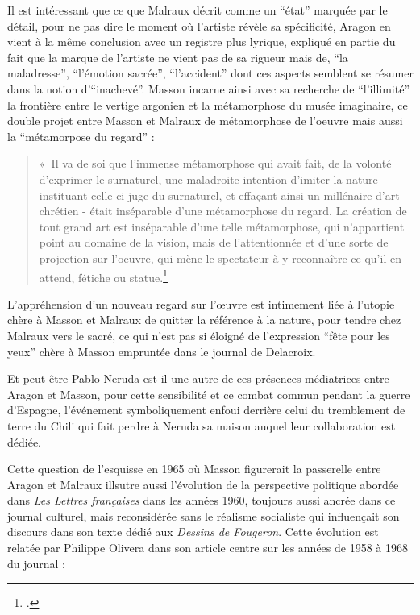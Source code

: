 Il est intéressant que ce que Malraux décrit comme un \enquote{état} marquée par le détail, pour ne pas dire le moment où l'artiste révèle sa spécificité, Aragon en vient à la même conclusion avec un registre plus lyrique, expliqué en partie du fait que la marque de l'artiste ne vient pas de sa rigueur mais de, \enquote{la maladresse}, \enquote{l'émotion sacrée}, \enquote{l'accident} dont ces aspects semblent se résumer dans la notion d'\enquote{inachevé}. Masson incarne ainsi avec sa recherche de \enquote{l'illimité} la frontière entre le vertige argonien et la métamorphose du musée imaginaire, ce double projet entre Masson et Malraux de métamorphose de l'oeuvre mais aussi la \enquote{métamorpose du regard} : 

\begin{quote}
« Il va de soi que l’immense métamorphose qui avait fait, de la volonté d’exprimer le surnaturel, une maladroite intention d’imiter la nature - instituant celle-ci juge du surnaturel, et effaçant ainsi un millénaire d’art chrétien - était inséparable d’une métamorphose du regard. La création de tout grand art est inséparable d’une telle métamorphose, qui n’appartient point au domaine de la vision, mais de l’attentionnée et d’une sorte de projection sur l’oeuvre, qui mène le spectateur à y reconnaître ce qu’il en attend, fétiche ou statue.\footcite{p201}\end{quote}

L'appréhension d'un nouveau regard sur l'\oe{}uvre est intimement liée à l'utopie chère à Masson et Malraux de quitter la référence à la nature, pour tendre chez Malraux vers le sacré, ce qui n'est pas si éloigné de l'expression \enquote{fête pour les yeux} chère à Masson empruntée dans le journal de Delacroix. 

	 Et peut-être Pablo Neruda est-il une autre de ces présences médiatrices entre Aragon et Masson, pour cette sensibilité et ce combat commun pendant la guerre d'Espagne, l'événement symboliquement enfoui derrière celui du tremblement de terre du Chili qui fait perdre à Neruda sa maison auquel leur collaboration est dédiée. 

	Cette question de l'esquisse en 1965 où Masson figurerait la passerelle entre Aragon et Malraux illsutre aussi l'évolution de la perspective politique abordée dans \emph{Les Lettres françaises} dans les années 1960, toujours aussi ancrée dans ce journal culturel, mais reconsidérée sans le réalisme socialiste qui influençait son discours dans son texte dédié aux \emph{Dessins de Fougeron}. Cette évolution est relatée par Philippe Olivera dans son article centre sur les années de 1958 à 1968 du journal : 


